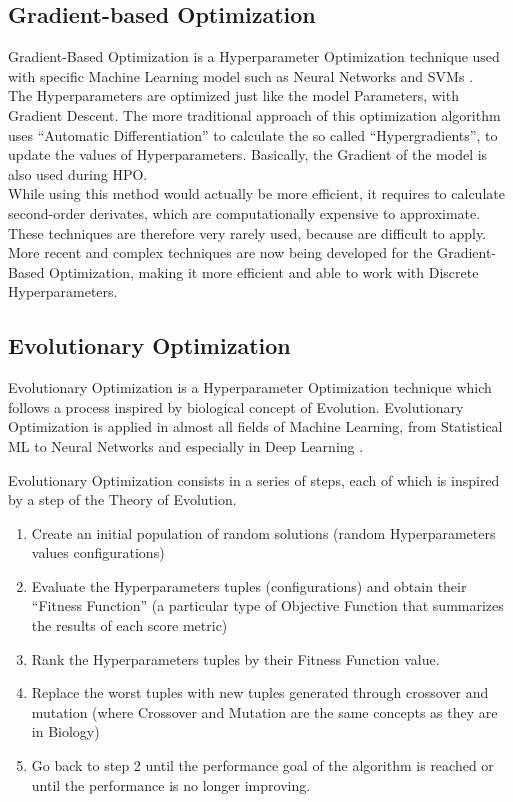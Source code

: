 \subsection{Gradient-based Optimization}

Gradient-Based Optimization is a Hyperparameter Optimization technique used with specific Machine Learning model such as Neural Networks and SVMs \cite{Tesi-1.8} \cite{Tesi-1.1}. 
\\[0.3cm]The Hyperparameters are optimized just like the model Parameters, with Gradient Descent.
The more traditional approach of this optimization algorithm uses “Automatic Differentiation” to calculate the so called “Hypergradients”, to update the values of Hyperparameters. Basically, the Gradient of the model is also used during HPO.
\\[0.3cm]While using this method would actually be more efficient, it requires to calculate second-order derivates, which are computationally expensive to approximate. These techniques are therefore very rarely used, because are difficult to apply.
\\[0.3cm]More recent and complex techniques are now being developed for the Gradient-Based Optimization, making it more efficient and able to work with Discrete Hyperparameters.

\subsection{Evolutionary Optimization}

Evolutionary Optimization is a Hyperparameter Optimization technique which follows a process inspired by biological concept of Evolution.
Evolutionary Optimization is applied in almost all fields of Machine Learning, from Statistical ML to Neural Networks and especially in Deep Learning \cite{Tesi-1.1} \cite{OptunaSamplers-NSGAII} \cite{OptunaSamplers-CMA-ES}.

Evolutionary Optimization consists in a series of steps, each of which is inspired by a step of the Theory of Evolution.
\begin{enumerate}[itemsep=0.1cm]
    \item Create an initial population of random solutions (random Hyperparameters values configurations)
    \item Evaluate the Hyperparameters tuples (configurations) and obtain their “Fitness Function” (a particular type of Objective Function that summarizes the results of each score metric)
    \item Rank the Hyperparameters tuples by their Fitness Function value.
    \item Replace the worst tuples with new tuples generated through crossover and mutation (where Crossover and Mutation are the same concepts as they are in Biology)
    \item Go back to step 2 until the performance goal of the algorithm is reached or until the performance is no longer improving.
\end{enumerate}


